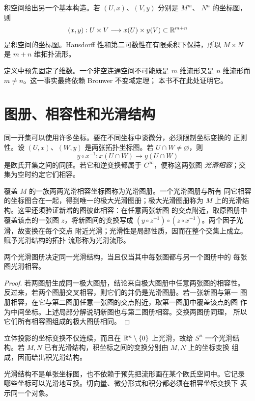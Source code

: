积空间给出另一个基本构造。若 \((U,x)\)、\((V,y)\) 分别是 \(M^m\)、
\(N^n\) 的坐标图，则
\[
 (x,y):U\times V\longrightarrow x(U)\times y(V)\subset\mathbb{R}^{m+n}
\]
是积空间的坐标图。Hausdorff 性和第二可数性在有限乘积下保持，所以
\(M\times N\) 是 \(m+n\) 维拓扑流形。

定义中预先固定了维数。一个非空连通空间不可能既是 \(m\) 维流形又是
\(n\) 维流形而 \(m\ne n\)。这一事实最终依赖 Brouwer 不变域定理；
本书不在此处证明它。

\section{图册、相容性和光滑结构}

同一开集可以使用许多坐标。要在不同坐标中谈微分，必须限制坐标变换的
正则性。设 \((U,x)\)、\((W,y)\) 是两张拓扑坐标图。若
\(U\cap W\ne\varnothing\)，则
\[
 y\circ x^{-1}:x(U\cap W)\longrightarrow y(U\cap W)
\]
是欧氏开集之间的同胚。若它和逆变换都属于 \(C^\infty\)，便称这两张图
\emph{光滑相容}；交集为空时约定它们相容。

覆盖 \(M\) 的一族两两光滑相容坐标图称为光滑图册。一个光滑图册与所有
同它相容的坐标图合在一起，得到唯一的极大光滑图册；极大光滑图册称为
\(M\) 上的光滑结构。这里还须验证新增的图彼此相容：在任意两张新图
的交点附近，取原图册中覆盖该点的一张图 $z$，将新图间的变换写成
$(y\circ z^{-1})\circ(z\circ x^{-1})$。两个因子光滑，故变换在每个交点
附近光滑；光滑性是局部性质，因而在整个交集上成立。赋予光滑结构的拓扑
流形称为光滑流形。

\begin{proposition}\label{prop:atlas-equivalence}
两个光滑图册决定同一光滑结构，当且仅当其中每张图都与另一个图册中的
每张图光滑相容。
\end{proposition}

\begin{proof}
若两图册生成同一极大图册，结论来自极大图册中任意两张图的相容性。
反过来，若两个图册交叉相容，则它们的并仍是光滑图册。若一张新图与第一
图册相容，在它与第二图册任意一张图的交点附近，取第一图册中覆盖该点的图
作为中间坐标。上述局部分解说明新图也与第二图册相容。交换两图册同理，
所以它们所有相容图组成的极大图册相同。
\end{proof}

立体投影的坐标变换不仅连续，而且在
\(\mathbb{R}^n\setminus\{0\}\) 上光滑，故给 \(S^n\) 一个光滑结构。若
\(M,N\) 已有光滑结构，积坐标之间的变换分别由 \(M,N\) 上的坐标变换
组成，因而给出积光滑结构。

光滑结构不是单张坐标图，也不依赖于预先把流形画在某个欧氏空间中。它记录
哪些坐标可以光滑地互换。切向量、微分形式和积分都必须在相容坐标变换下
表示同一个对象。


